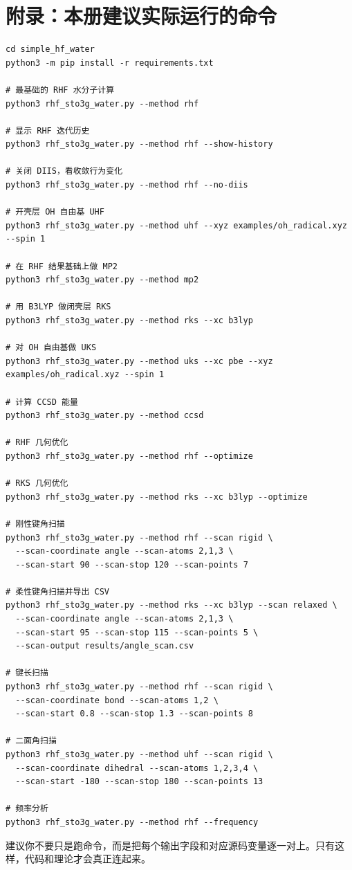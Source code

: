 \documentclass[UTF8,11pt,fontset=fandol]{ctexbook}
\begin{document}
\chapter*{附录：本册建议实际运行的命令}

\begin{lstlisting}[style=bashstyle]
cd simple_hf_water
python3 -m pip install -r requirements.txt

# 最基础的 RHF 水分子计算
python3 rhf_sto3g_water.py --method rhf

# 显示 RHF 迭代历史
python3 rhf_sto3g_water.py --method rhf --show-history

# 关闭 DIIS，看收敛行为变化
python3 rhf_sto3g_water.py --method rhf --no-diis

# 开壳层 OH 自由基 UHF
python3 rhf_sto3g_water.py --method uhf --xyz examples/oh_radical.xyz --spin 1

# 在 RHF 结果基础上做 MP2
python3 rhf_sto3g_water.py --method mp2

# 用 B3LYP 做闭壳层 RKS
python3 rhf_sto3g_water.py --method rks --xc b3lyp

# 对 OH 自由基做 UKS
python3 rhf_sto3g_water.py --method uks --xc pbe --xyz examples/oh_radical.xyz --spin 1

# 计算 CCSD 能量
python3 rhf_sto3g_water.py --method ccsd

# RHF 几何优化
python3 rhf_sto3g_water.py --method rhf --optimize

# RKS 几何优化
python3 rhf_sto3g_water.py --method rks --xc b3lyp --optimize

# 刚性键角扫描
python3 rhf_sto3g_water.py --method rhf --scan rigid \
  --scan-coordinate angle --scan-atoms 2,1,3 \
  --scan-start 90 --scan-stop 120 --scan-points 7

# 柔性键角扫描并导出 CSV
python3 rhf_sto3g_water.py --method rks --xc b3lyp --scan relaxed \
  --scan-coordinate angle --scan-atoms 2,1,3 \
  --scan-start 95 --scan-stop 115 --scan-points 5 \
  --scan-output results/angle_scan.csv

# 键长扫描
python3 rhf_sto3g_water.py --method rhf --scan rigid \
  --scan-coordinate bond --scan-atoms 1,2 \
  --scan-start 0.8 --scan-stop 1.3 --scan-points 8

# 二面角扫描
python3 rhf_sto3g_water.py --method uhf --scan rigid \
  --scan-coordinate dihedral --scan-atoms 1,2,3,4 \
  --scan-start -180 --scan-stop 180 --scan-points 13

# 频率分析
python3 rhf_sto3g_water.py --method rhf --frequency
\end{lstlisting}

建议你不要只是跑命令，而是把每个输出字段和对应源码变量逐一对上。只有这样，代码和理论才会真正连起来。
\end{document}
